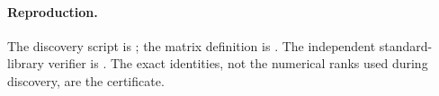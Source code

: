 \documentclass[11pt]{article}
\begin{document}
\paragraph{Reproduction.}
The discovery script is ; the
matrix definition is . The independent
standard-library verifier is
.
The exact identities, not the numerical ranks used during discovery,
are the certificate.
\end{document}
